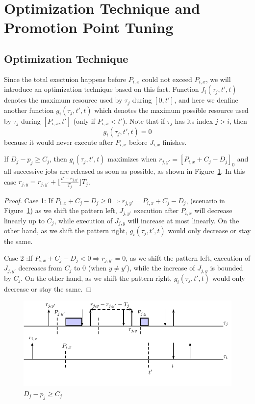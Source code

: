 \section{Optimization Technique and Promotion Point Tuning}
\subsection{Optimization Technique}
Since the total exectuion happens before $P_{i,x}$ could not exceed $P_{i,x}$, we will introduce an optimization technique based on this fact.  Function $f_i(\tau_j,t',t)$ denotes the maximum resource used by $\tau_j$ during $[0,t']$, and here we denfine another function $g_i(\tau_j,t',t)$ which denotes the maximum possible resource used by $\tau_j$ during $[P_{i,x},t']$ (only if $P_{i,x}<t'$). Note that if $\tau_j$ has its index $j>i$, then 
\[
g_i(\tau_j,t',t)=0
\]
because it would never execute after $P_{i,x}$ before $J_{i,x}$ finishes.
\begin{lemma}
If $D_j-p_j\geq C_j$, then $g_i(\tau_j,t',t)$ maximizes when $r_{j,y'}=[P_{i,x}+C_j-D_j]_0$ and all successive jobs are released as soon as possible,  as shown in Figure~\ref{fig:o1}. In this case  $r_{j,y}=r_{j,y'}+\lfloor \frac{t'-r_{j,y'}}{T_j}\rfloor T_j$.
\end{lemma}
\begin{proof}
Case 1: If $P_{i,x}+C_j-D_j\geq 0\Rightarrow r_{j,y'}=P_{i,x}+C_j-D_j$, (scenario in Figure~\ref{fig:o1}) as we shift the pattern left, $J_{j,y'}$ execution after $P_{i,x}$ will decrease linearly up to $C_j$, while  execution of $J_{j,y}$  will increase at most linearly. On the other hand, as we shift the pattern right, $g_i(\tau_j,t',t)$  would only decrease or stay the same.

Case 2 :If $P_{i,x}+C_j-D_j<0\Rightarrow r_{j,y'}=0$, as we shift the pattern left, execution of $J_{j,y'}$ decreases from $C_j$ to $0$ (when $y\neq y'$), while the increase of $J_{j,y}$ is bounded by $C_j$. On the other hand, as we shift the pattern right, $g_i(\tau_j,t',t)$  would only decrease or stay the same.
\end{proof}

\begin{figure}[h!]
 \centering
\includegraphics[scale=0.7]{fig/Cx}  
\caption{$D_j-p_j\geq C_j$}
  \label{fig:o1}
\end{figure}

